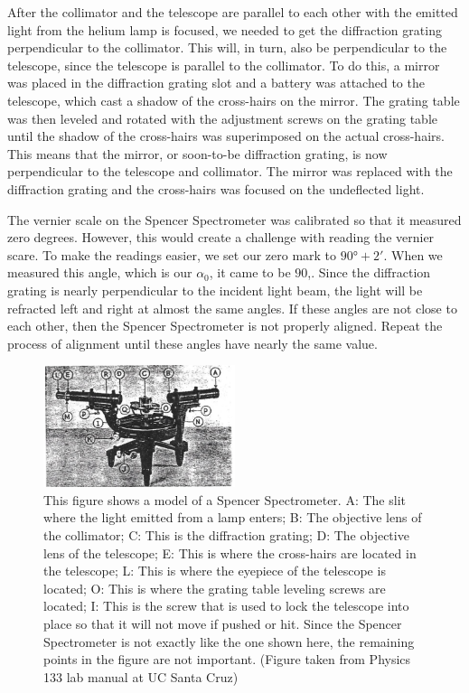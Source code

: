 \documentclass[a4paper]{article}
\begin{document}
After the collimator and the telescope are parallel to each other with the emitted light from the helium lamp is focused, we needed to get the diffraction grating perpendicular to the collimator. This will, in turn, also be perpendicular to the telescope, since the telescope is parallel to the collimator. To do this, a mirror was placed in the diffraction grating slot and a battery was attached to the telescope, which cast a shadow of the cross-hairs on the mirror. The grating table was then leveled and rotated with the adjustment screws on the grating table until the shadow of the cross-hairs was superimposed on the actual cross-hairs. This means that the mirror, or soon-to-be diffraction grating, is now perpendicular to the telescope and collimator. The mirror was replaced with the diffraction grating and the cross-hairs was focused on the undeﬂected light.

The vernier scale on the Spencer Spectrometer was calibrated so that it measured zero degrees. However, this would create a challenge with reading the vernier scare. To make the readings easier, we set our zero mark to $90°+2'$. When we measured this angle, which is our $\alpha_0$, it came to be $90$,. Since the diffraction grating is nearly perpendicular to the incident light beam, the light will be refracted left and right at almost the same angles. If these angles are not close to each other, then the Spencer Spectrometer is not properly aligned. Repeat the process of alignment until these angles have nearly the same value.
\begin{figure}[h]
\centering
\includegraphics[width=0.5\textwidth]{2}
\caption{This figure shows a model of a Spencer Spectrometer. A: The slit where the light emitted from a lamp enters; B: The objective lens of the collimator; C: This is the diffraction grating; D: The objective lens of the telescope; E: This is where the cross-hairs are located in the telescope; L: This is where the eyepiece of the telescope is located; O: This is where the grating table leveling screws are located; I: This is the screw that is used to lock the telescope into place so that it will not move if pushed or hit. Since the Spencer Spectrometer is not exactly like the one shown here, the remaining points in the figure are not important. (Figure taken from Physics 133 lab manual at UC Santa Cruz)}
\end{figure}
\end{document}
